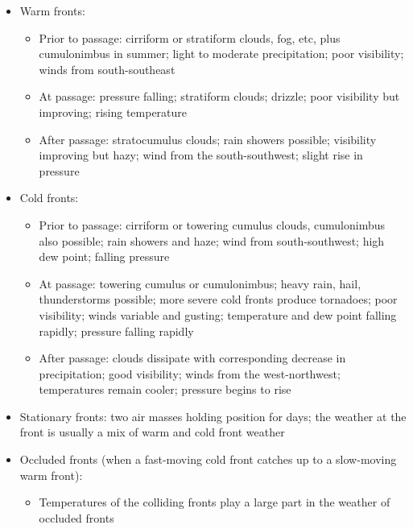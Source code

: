 \documentclass[twoside,openright]{report}
\begin{document}
\begin{itemize}
  \item Warm fronts:
    \begin{itemize}
      \item Prior to passage: cirriform or stratiform clouds, fog, etc, plus
        cumulonimbus in summer; light to moderate precipitation; poor
        visibility; winds from south-southeast

      \item At passage: pressure falling; stratiform clouds; drizzle; poor
        visibility but improving; rising temperature

      \item After passage: stratocumulus clouds; rain showers possible;
        visibility improving but hazy; wind from the south-southwest; slight
        rise in pressure
    \end{itemize}

  \item Cold fronts:
    \begin{itemize}
      \item Prior to passage: cirriform or towering cumulus clouds,
        cumulonimbus also possible; rain showers and haze; wind from
        south-southwest; high dew point; falling pressure

      \item At passage: towering cumulus or cumulonimbus; heavy rain, hail,
        thunderstorms possible; more severe cold fronts produce tornadoes; poor
        visibility; winds variable and gusting; temperature and dew point
        falling rapidly; pressure falling rapidly

      \item After passage: clouds dissipate with corresponding decrease in
        precipitation; good visibility; winds from the west-northwest;
        temperatures remain cooler; pressure begins to rise
    \end{itemize}

  \item Stationary fronts: two air masses holding position for days; the
    weather at the front is usually a mix of warm and cold front weather

  \item Occluded fronts (when a fast-moving cold front catches up to a
    slow-moving warm front):
    \begin{itemize}
      \item Temperatures of the colliding fronts play a large part in the
        weather of occluded fronts


\end{itemize}
\end{itemize}
\end{document}
